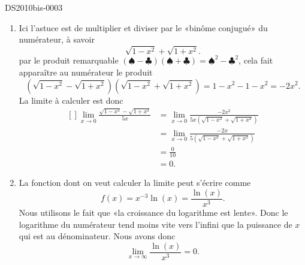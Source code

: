 \begin{corrige}{DS2010bis-0003}
\begin{enumerate}
		\item
			Ici l'astuce est de multiplier et diviser par le «binôme conjugué» du numérateur, à savoir
			\begin{equation}
                          \sqrt{1-x^2}+\sqrt{1+x^2}.
			\end{equation}
                        par le produit remarquable $(\spadesuit-\clubsuit)(\spadesuit+\clubsuit)=\spadesuit^2-\clubsuit^2$, cela fait apparaître au numérateur le produit
			\begin{equation}
                          (\sqrt{1-x^2}-\sqrt{1+x^2})(\sqrt{1-x^2}+\sqrt{1+x^2})=1-x^2-1-x^2=-2x^2.
			\end{equation}
			 La limite à calculer est donc
			 \begin{equation}
				 \begin{aligned}[]
					\lim_{x\to 0}\frac{\sqrt{1-x^2}-\sqrt{1+x^2}}{5x}&=\lim_{x\to 0}\frac{-2x^2}{5x(\sqrt{1-x^2}+\sqrt{1+x^2})}\\
					&=\lim_{x\to 0}\frac{-2x}{5(\sqrt{1-x^2}+\sqrt{1+x^2})}\\
					&=\frac{0}{10}\\
					&=0.
				 \end{aligned}
			 \end{equation}

		\item
                  La fonction dont on veut calculer la limite peut s'écrire comme 
                  \begin{equation}
                    f(x)=x^{-3}\ln(x)=\frac{\ln(x)}{x^3}.
                  \end{equation}
                  Nous utilisons le fait que «la croissance du logarithme est lente». Donc le logarithme du numérateur tend moins vite vers l'infini que la puissance de $x$ qui est au dénominateur. Nous avons donc
			\begin{equation}
				\lim_{x\to \infty} \frac{ \ln(x) }{ x^{3} }=0.
			\end{equation}
	\end{enumerate}

\end{corrige}
